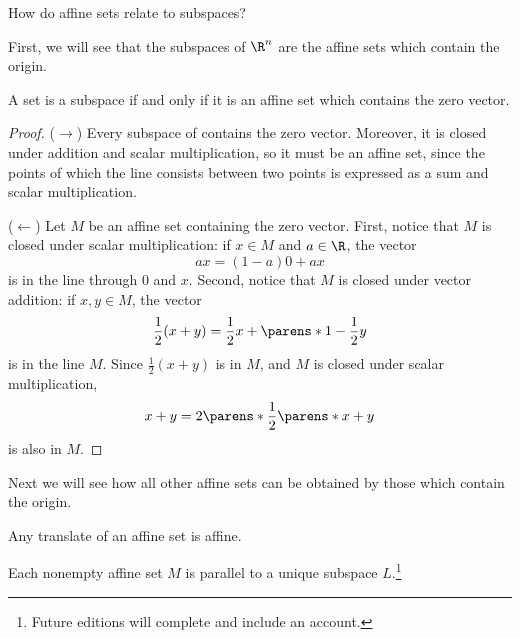 

How do affine sets relate to subspaces?


First, we will see that the subspaces of $\R^n$ are the affine sets which contain the origin.

\begin{prop}

A set is a subspace if and only if it is an affine set which contains the zero vector.

\begin{proof}

($\rightarrow$) Every subspace of contains the zero vector. Moreover, it is closed under addition and scalar multiplication, so it must be an affine set, since the points of which the line consists between two points is expressed as a sum and scalar multiplication.

($\leftarrow$) Let $M$ be an affine set containing the zero vector. First, notice that $M$ is closed under scalar multiplication: if $x \in M$ and $a \in \R$, the vector
$$
  ax = (1 - a)0 + ax
$$
is in the line through $0$ and $x$.
Second, notice that $M$ is closed under vector addition: if $x, y \in M$, the vector
$$
  \frac{1}{2}(x + y) = \frac{1}{2}x + \parens*{1 - \frac{1}{2}}y
$$
is in the line $M$.
  Since $\frac{1}{2}(x + y)$ is in $M$, and $M$ is closed under scalar multiplication,
$$
  x + y = 2\parens*{\frac{1}{2}\parens*{x + y}}
$$
is also in $M$.

\end{proof}

\end{prop}

Next we will see how all other affine sets can be obtained by those which contain the origin.


Any translate of an affine set is affine.

\begin{prop}

  Each nonempty affine set $M$ is parallel to a unique subspace $L$.\footnote{Future editions will complete and include an account.}

\end{prop}
